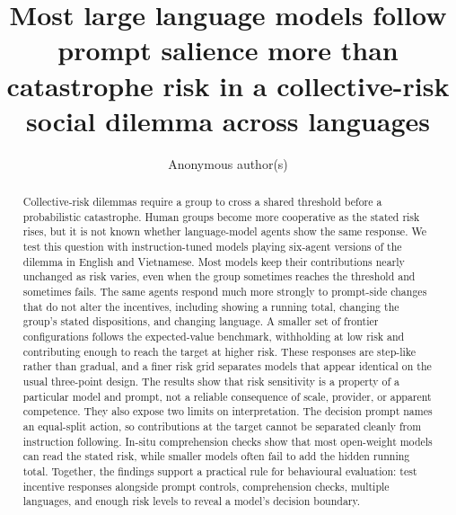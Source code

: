 \documentclass[openacc]{rsproca_new}
\begin{document}
\title{Most large language models follow prompt salience more than catastrophe risk in a collective-risk social dilemma across languages}

\author{Anonymous author(s)}

\address{Anonymous affiliation}

\subject{artificial intelligence, behaviour, evolutionary game theory}


\begin{abstract}
Collective-risk dilemmas require a group to cross a shared threshold before a probabilistic catastrophe. Human groups become more cooperative as the stated risk rises, but it is not known whether language-model agents show the same response. We test this question with instruction-tuned models playing six-agent versions of the dilemma in English and Vietnamese. Most models keep their contributions nearly unchanged as risk varies, even when the group sometimes reaches the threshold and sometimes fails. The same agents respond much more strongly to prompt-side changes that do not alter the incentives, including showing a running total, changing the group's stated dispositions, and changing language. A smaller set of frontier configurations follows the expected-value benchmark, withholding at low risk and contributing enough to reach the target at higher risk. These responses are step-like rather than gradual, and a finer risk grid separates models that appear identical on the usual three-point design. The results show that risk sensitivity is a property of a particular model and prompt, not a reliable consequence of scale, provider, or apparent competence. They also expose two limits on interpretation. The decision prompt names an equal-split action, so contributions at the target cannot be separated cleanly from instruction following. In-situ comprehension checks show that most open-weight models can read the stated risk, while smaller models often fail to add the hidden running total. Together, the findings support a practical rule for behavioural evaluation: test incentive responses alongside prompt controls, comprehension checks, multiple languages, and enough risk levels to reveal a model's decision boundary.
\end{abstract}
\end{document}
